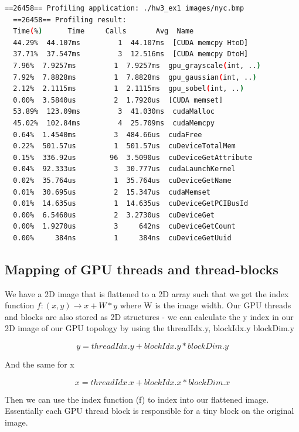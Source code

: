 \documentclass{article}
\begin{document}
\begin{mdframed}[backgroundcolor=codeColor,leftmargin=0.0cm,hidealllines=true,%
  innerleftmargin=0.1cm,innerrightmargin=0.1cm,innertopmargin=0.5cm,innerbottommargin=0.10cm,
  roundcorner=15pt]
  \begin{lstlisting}[language=bash]
  ==26458== Profiling application: ./hw3_ex1 images/nyc.bmp
  ==26458== Profiling result:
  Time(%)      Time     Calls       Avg  Name
  44.29%  44.107ms         1  44.107ms  [CUDA memcpy HtoD]
  37.71%  37.547ms         3  12.516ms  [CUDA memcpy DtoH]
  7.96%  7.9257ms         1  7.9257ms  gpu_grayscale(int, ..)
  7.92%  7.8828ms         1  7.8828ms  gpu_gaussian(int, ..)
  2.12%  2.1115ms         1  2.1115ms  gpu_sobel(int, ..)
  0.00%  3.5840us         2  1.7920us  [CUDA memset]
  53.89%  123.09ms         3  41.030ms  cudaMalloc
  45.02%  102.84ms         4  25.709ms  cudaMemcpy
  0.64%  1.4540ms         3  484.66us  cudaFree
  0.22%  501.57us         1  501.57us  cuDeviceTotalMem
  0.15%  336.92us        96  3.5090us  cuDeviceGetAttribute
  0.04%  92.333us         3  30.777us  cudaLaunchKernel
  0.02%  35.764us         1  35.764us  cuDeviceGetName
  0.01%  30.695us         2  15.347us  cudaMemset
  0.01%  14.635us         1  14.635us  cuDeviceGetPCIBusId
  0.00%  6.5460us         2  3.2730us  cuDeviceGet
  0.00%  1.9270us         3     642ns  cuDeviceGetCount
  0.00%     384ns         1     384ns  cuDeviceGetUuid
  \end{lstlisting}
\end{mdframed}


\subsection{Mapping of GPU threads and thread-blocks}%
\label{sub:mapping_of_gpu_threads_and_thread_blocks}

We have a 2D image that is flattened to a 2D array such that we get the index function $f: (x, y) \rightarrow x + W * y$ where W is the image width. Our GPU threads 
and blocks are also stored as 2D structures - we can calculate the y index in our 2D image of our GPU topology by using the threadIdx.y, blockIdx.y blockDim.y

$$ y= threadIdx.y + blockIdx.y * blockDim.y$$ 

And the same for x

$$ x = threadIdx.x + blockIdx.x * blockDim.x $$ 

Then we can use the index function (f) to index into our flattened image. Essentially each GPU thread block is responsible for a tiny block on the original image.
\end{document}
